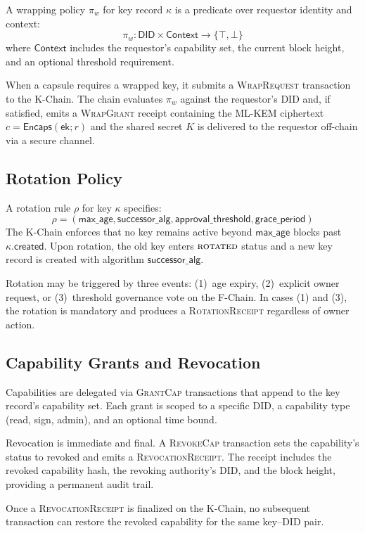 \begin{definition}\label{def:wrap-policy}
A wrapping policy $\pi_w$ for key record $\kappa$ is a predicate over requestor
identity and context:
\[
    \pi_w : \mathsf{DID} \times \mathsf{Context} \to \{\top, \bot\}
\]
where $\mathsf{Context}$ includes the requestor's capability set, the current block
height, and an optional threshold requirement.
\end{definition}

When a capsule requires a wrapped key, it submits a \textsc{WrapRequest} transaction
to the K-Chain. The chain evaluates $\pi_w$ against the requestor's DID and, if
satisfied, emits a \textsc{WrapGrant} receipt containing the ML-KEM ciphertext
$c = \mathsf{Encaps}(\mathsf{ek}; r)$ and the shared secret $K$ is delivered
to the requestor off-chain via a secure channel.

\subsection{Rotation Policy}

\begin{definition}\label{def:rotation}
A rotation rule $\rho$ for key $\kappa$ specifies:
\[
    \rho = (\mathsf{max\_age}, \mathsf{successor\_alg}, \mathsf{approval\_threshold},
            \mathsf{grace\_period})
\]
The K-Chain enforces that no key remains active beyond $\mathsf{max\_age}$ blocks
past $\kappa.\mathsf{created}$. Upon rotation, the old key enters
$\textsc{rotated}$ status and a new key record is created with algorithm
$\mathsf{successor\_alg}$.
\end{definition}

Rotation may be triggered by three events: (1)~age expiry, (2)~explicit owner request,
or (3)~threshold governance vote on the F-Chain. In cases (1) and (3), the rotation
is mandatory and produces a \textsc{RotationReceipt} regardless of owner action.

\subsection{Capability Grants and Revocation}

Capabilities are delegated via \textsc{GrantCap} transactions that append to the
key record's capability set. Each grant is scoped to a specific DID, a capability
type (read, sign, admin), and an optional time bound.

Revocation is immediate and final. A \textsc{RevokeCap} transaction sets the
capability's status to revoked and emits a \textsc{RevocationReceipt}. The receipt
includes the revoked capability hash, the revoking authority's DID, and the block
height, providing a permanent audit trail.

\begin{proposition}\label{prop:revocation}
Once a \textsc{RevocationReceipt} is finalized on the K-Chain, no subsequent
transaction can restore the revoked capability for the same key--DID pair.
\end{proposition}


